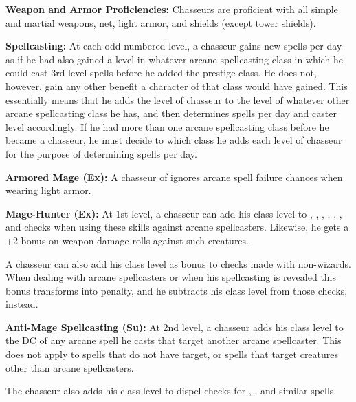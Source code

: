 {
\textbf{Weapon and Armor Proficiencies:} Chasseurs are proficient with all simple and martial weapons, net, light armor, and shields (except tower shields).

\textbf{Spellcasting:} At each odd-numbered level, a chasseur gains new spells per day as if he had also gained a level in whatever arcane spellcasting class in which he could cast 3rd-level spells before he added the prestige class. He does not, however, gain any other benefit a character of that class would have gained. This essentially means that he adds the level of chasseur to the level of whatever other arcane spellcasting class he has, and then determines spells per day and caster level accordingly. If he had more than one arcane spellcasting class before he became a chasseur, he must decide to which class he adds each level of chasseur for the purpose of determining spells per day.

\textbf{Armored Mage (Ex):} A chasseur of ignores arcane spell failure chances when wearing light armor.

\textbf{Mage-Hunter (Ex):} At 1st level, a chasseur can add his class level to , , , , , , and  checks when using these skills against arcane spellcasters. Likewise, he gets a +2 bonus on weapon damage rolls against such creatures.

A chasseur can also add his class level as bonus to  checks made with non-wizards. When dealing with arcane spellcasters or when his spellcasting is revealed this bonus transforms into penalty, and he subtracts his class level from those checks, instead.

\textbf{Anti-Mage Spellcasting (Su):} At 2nd level, a chasseur adds \onehalf his class level to the DC of any arcane spell he casts that target another arcane spellcaster. This does not apply to spells that do not have target, or spells that target creatures other than arcane spellcasters.

The chasseur also adds \onehalf his class level to dispel checks for , , and similar spells.


}
